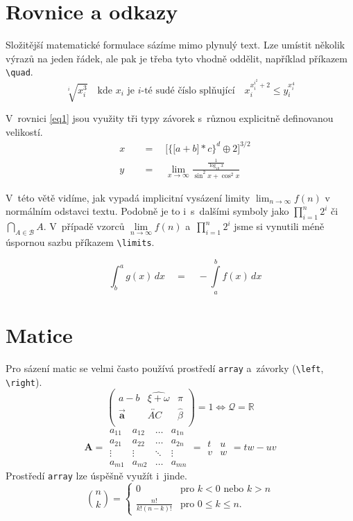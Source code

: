 \documentclass[11pt,twocolumn]{article}
\theoremstyle{plain}
\begin{document}
\section{Rovnice a odkazy}
Složitější matematické formulace sázíme mimo plynulý text. Lze umístit několik výrazů na jeden řádek, ale pak je třeba tyto vhodně oddělit, například příkazem \texttt{\textbackslash quad}.
\\
$$
\sqrt[i]{x_{i}^{3}} \quad \text{kde } x_i \text{ je } i \text{-té sudé číslo splňující}\quad x_{i}^{x_{i}^{i^{2}}+2} \leq y_{i}^{x_{i}^{4}}
$$

V~rovnici \eqref{eq1} jsou využity tři typy závorek s~různou e\-xplicitně definovanou velikostí.
\begin{align}
           \quad x\quad&=\quad\bigg[\Big\{\big[a+b\big] * c\Big\}^{d} \oplus 2\bigg]^{3 / 2}\label{eq1}\\
           \quad y\quad&=\quad\lim _{x \rightarrow \infty} \frac{\frac{1}{\log _{10} x}}{\sin ^{2} x+\cos ^{2} x} \nonumber
\end{align}

V~této větě vidíme, jak vypadá implicitní vysázení limity $\lim _{n \rightarrow \infty} f(n)$ v normálním odstavci textu. Podobně je to i~s~dalšími symboly jako $\prod_{i=1}^{n} 2^{i}$ či ~$\bigcap_{A \in \mathcal{B}}A$. V~případě vzorců $\lim\limits_{n\rightarrow \infty}f(n)$ a~$\prod\limits_{i=1}^n 2^{i}$ jsme si vynutili méně úspornou sazbu příkazem \texttt{\textbackslash limits}.

\begin{equation}
    \quad\int_{b}^{a}g(x)\,dx\quad=\quad -\int\limits_{a}^{b}f(x)\,dx
\end{equation}

\section{Matice}
Pro sázení matic se velmi často používá prostředí \texttt{array} a~závorky (\texttt{\textbackslash left}, \texttt{\textbackslash right}).
$$
\left(
\begin{array}{ccc}
    a-b & \widehat{\xi+\omega} & \pi \\
    \vec{\mathbf{a}} & \overleftrightarrow{AC} & \hat{\beta}\\
\end{array}
\right)
= 1 \Longleftrightarrow \mathcal{Q} = \mathbb{R}
$$
$$
\mathbf{A} = 
\begin{array}{||cccc||}
a_{11} & a_{12} & \dots & a_{1n}\\
a_{21} & a_{22} & \dots & a_{2n}\\
\vdots & \vdots & \ddots & \vdots\\
 a_{m1} & a_{m2} & \dots & a_{mn}
\end{array}
= 
\begin{array}{|cc|}
t & u \\
v & w
\end{array}
= tw - uv
$$
Prostředí \texttt{array} lze úspěšně využít i~jinde.
$$
\binom{n}{k} = 
\left\{
\begin{array}{cl}
     0 & \text{pro } k < 0 \text{ nebo } k > n\\
     \frac{n!}{k!(n-k)!} & \text{pro } 0 \leq k \leq n.
\end{array}
\right.
$$
\end{document}

